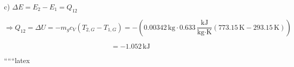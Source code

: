 c) $\Delta E = E_2 - E_1 = Q_{12}$

\[
\Rightarrow Q_{12} = \Delta U = -m_g c_V (T_{2,G} - T_{1,G}) = -(0.00342 \, \text{kg} \cdot 0.633 \, \frac{\text{kJ}}{\text{kg} \cdot \text{K}} (773.15 \, \text{K} - 293.15 \, \text{K}))
\]

\[
= -1.052 \, \text{kJ}
\]

``````latex